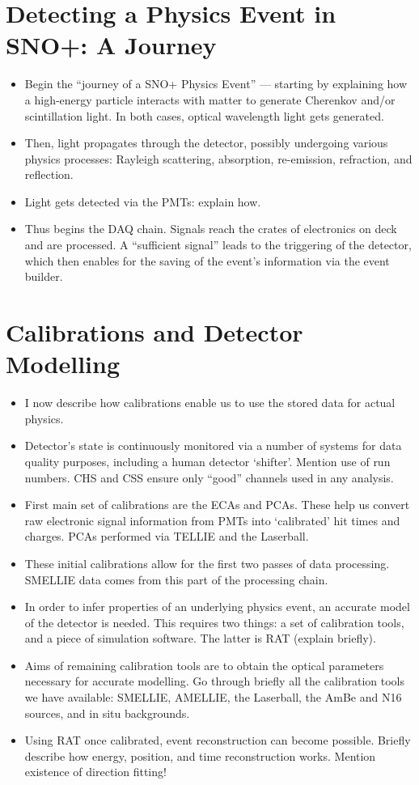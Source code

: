 \section{Detecting a Physics Event in SNO+: A Journey}
\begin{itemize}
    \item Begin the ``journey of a SNO+ Physics Event'' --- starting by explaining how a high-energy particle interacts with matter to generate Cherenkov and/or scintillation light. In both cases, optical wavelength light gets generated.
    \item Then, light propagates through the detector, possibly undergoing various physics processes: Rayleigh scattering, absorption, re-emission, refraction, and reflection.
    \item Light gets detected via the PMTs: explain how.
    \item Thus begins the DAQ chain. Signals reach the crates of electronics on deck and are processed. A ``sufficient signal'' leads to the triggering of the detector, which then enables for the saving of the event's information via the event builder.
\end{itemize}
\section{Calibrations and Detector Modelling}
\begin{itemize}
    \item I now describe how calibrations enable us to use the stored data for actual physics.
    \item Detector's state is continuously monitored via a number of systems for data quality purposes, including a human detector `shifter'. Mention use of run numbers. CHS and CSS ensure only ``good'' channels used in any analysis.
    \item First main set of calibrations are the ECAs and PCAs. These help us convert raw electronic signal information from PMTs into `calibrated' hit times and charges. PCAs performed via TELLIE and the Laserball.
    \item These initial calibrations allow for the first two passes of data processing. SMELLIE data comes from this part of the processing chain.
    \item In order to infer properties of an underlying physics event, an accurate model of the detector is needed. This requires two things: a set of calibration tools, and a piece of simulation software. The latter is RAT (explain briefly).
    \item Aims of remaining calibration tools are to obtain the optical parameters necessary for accurate modelling. Go through briefly all the calibration tools we have available: SMELLIE, AMELLIE, the Laserball, the AmBe and N16 sources, and in situ backgrounds.
    \item Using RAT once calibrated, event reconstruction can become possible. Briefly describe how energy, position, and time reconstruction works. Mention existence of direction fitting!
\end{itemize}